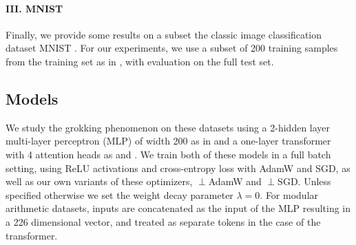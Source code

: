 \paragraph{III. MNIST}
Finally, we provide some results on a subset the classic image classification dataset MNIST \citep{deng2012mnist}. For our experiments, we use a subset of 200 training samples from the training set as in \cite{liu2023grokking}, with evaluation on the full test set.


\subsection{Models}
 We study the grokking phenomenon on these datasets using a 2-hidden layer multi-layer perceptron (MLP) of width 200 as in \cite{liu2023omnigrok} and a one-layer transformer with 4 attention heads as \cite{Nanda2023-hf} and \cite{power2022grokking}. We train both of these models in a full batch setting, using ReLU activations and cross-entropy loss with AdamW and SGD, as well as our own variants of these optimizers, $\perp$AdamW and $\perp$SGD. Unless specified otherwise we set the weight decay parameter $\lambda=0$. For modular arithmetic datasets, inputs are concatenated as the input of the MLP resulting in a 226 dimensional vector, and treated as separate tokens in the case of the transformer.

